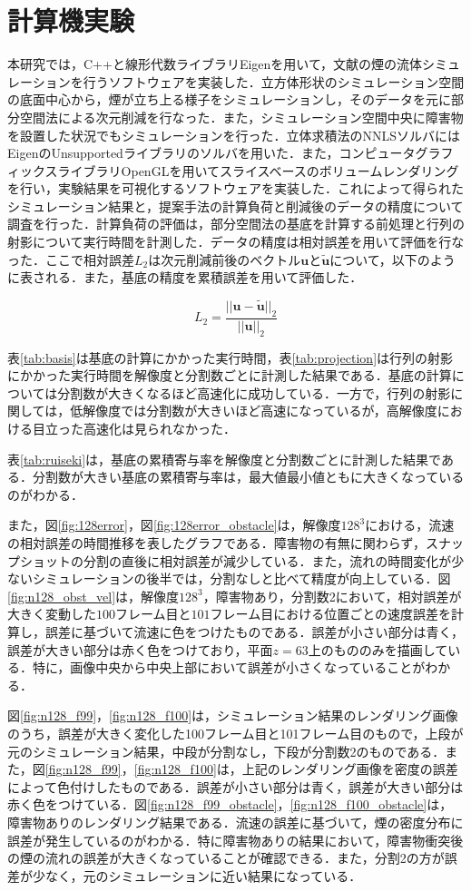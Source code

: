 \documentclass[a4j,12pt]{jreport}
\begin{document}
\chapter{計算機実験}
本研究では，C++と線形代数ライブラリEigenを用いて，文献\cite{fedkiw}の煙の流体シミュレーションを行うソフトウェアを実装した．立方体形状のシミュレーション空間の底面中心から，煙が立ち上る様子をシミュレーションし，そのデータを元に部分空間法による次元削減を行なった．また，シミュレーション空間中央に障害物を設置した状況でもシミュレーションを行った．立体求積法のNNLSソルバにはEigenのUnsupportedライブラリのソルバを用いた．また，コンピュータグラフィックスライブラリOpenGLを用いてスライスベースのボリュームレンダリングを行い，実験結果を可視化するソフトウェアを実装した．これによって得られたシミュレーション結果と，提案手法の計算負荷と削減後のデータの精度について調査を行った．計算負荷の評価は，部分空間法の基底を計算する前処理と行列の射影について実行時間を計測した．データの精度は相対誤差を用いて評価を行なった．ここで相対誤差$L_2$は次元削減前後のベクトル$\bm{u}$と$\bm{\widetilde{u}}$について，以下のように表される．また，基底の精度を累積誤差を用いて評価した．

\[
L_2 = \frac{|| \bm{u} - \bm{\widetilde{u}}||_2}{||  \bm{u} ||_2}
\]

表\ref{tab:basis}は基底の計算にかかった実行時間，表\ref{tab:projection}は行列の射影にかかった実行時間を解像度と分割数ごとに計測した結果である．基底の計算については分割数が大きくなるほど高速化に成功している．一方で，行列の射影に関しては，低解像度では分割数が大きいほど高速になっているが，高解像度における目立った高速化は見られなかった．

表\ref{tab:ruiseki}は，基底の累積寄与率を解像度と分割数ごとに計測した結果である．分割数が大きい基底の累積寄与率は，最大値最小値ともに大きくなっているのがわかる．

また，図\ref{fig:128error}，図\ref{fig:128error_obstacle}は，解像度$128^3$における，流速の相対誤差の時間推移を表したグラフである．障害物の有無に関わらず，スナップショットの分割の直後に相対誤差が減少している．また，流れの時間変化が少ないシミュレーションの後半では，分割なしと比べて精度が向上している．図\ref{fig:n128_obst_vel}は，解像度$128^3$，障害物あり，分割数2において，相対誤差が大きく変動した$100$フレーム目と$101$フレーム目における位置ごとの速度誤差を計算し，誤差に基づいて流速に色をつけたものである．誤差が小さい部分は青く，誤差が大きい部分は赤く色をつけており，平面$z=63$上のもののみを描画している．特に，画像中央から中央上部において誤差が小さくなっていることがわかる．

図\ref{fig:n128_f99}，\ref{fig:n128_f100}は，シミュレーション結果のレンダリング画像のうち，誤差が大きく変化した100フレーム目と101フレーム目のもので，上段が元のシミュレーション結果，中段が分割なし，下段が分割数2のものである．また，図\ref{fig:n128_f99}，\ref{fig:n128_f100}は，上記のレンダリング画像を密度の誤差によって色付けしたものである．誤差が小さい部分は青く，誤差が大きい部分は赤く色をつけている．図\ref{fig:n128_f99_obstacle}，\ref{fig:n128_f100_obstacle}は，障害物ありのレンダリング結果である．流速の誤差に基づいて，煙の密度分布に誤差が発生しているのがわかる．特に障害物ありの結果において，障害物衝突後の煙の流れの誤差が大きくなっていることが確認できる．また，分割2の方が誤差が少なく，元のシミュレーションに近い結果になっている．
\end{document}
